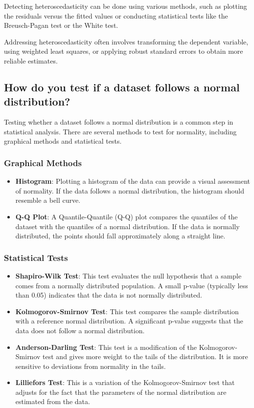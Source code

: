 \documentclass[12pt]{article}
\begin{document}
Detecting heteroscedasticity can be done using various methods, such as plotting the residuals versus the fitted values or conducting statistical tests like the Breusch-Pagan test or the White test.

Addressing heteroscedasticity often involves transforming the dependent variable, using weighted least squares, or applying robust standard errors to obtain more reliable estimates.

\subsection{How do you test if a dataset follows a normal distribution?}

Testing whether a dataset follows a normal distribution is a common step in statistical analysis. There are several methods to test for normality, including graphical methods and statistical tests.

\subsubsection{Graphical Methods}

\begin{itemize}
    \item \textbf{Histogram}: Plotting a histogram of the data can provide a visual assessment of normality. If the data follows a normal distribution, the histogram should resemble a bell curve.
    \item \textbf{Q-Q Plot}: A Quantile-Quantile (Q-Q) plot compares the quantiles of the dataset with the quantiles of a normal distribution. If the data is normally distributed, the points should fall approximately along a straight line.
\end{itemize}

\subsubsection{Statistical Tests}

\begin{itemize}
    \item \textbf{Shapiro-Wilk Test}: This test evaluates the null hypothesis that a sample comes from a normally distributed population. A small p-value (typically less than 0.05) indicates that the data is not normally distributed.
    \item \textbf{Kolmogorov-Smirnov Test}: This test compares the sample distribution with a reference normal distribution. A significant p-value suggests that the data does not follow a normal distribution.
    \item \textbf{Anderson-Darling Test}: This test is a modification of the Kolmogorov-Smirnov test and gives more weight to the tails of the distribution. It is more sensitive to deviations from normality in the tails.
    \item \textbf{Lilliefors Test}: This is a variation of the Kolmogorov-Smirnov test that adjusts for the fact that the parameters of the normal distribution are estimated from the data.
\end{itemize}
\end{document}
